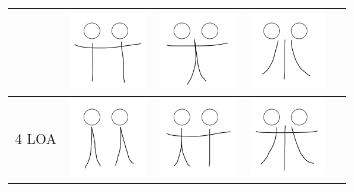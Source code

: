 \begin{table}[!htb]
\begin{tabular}{ | c | c || c | c | c | }
\begin{minipage}{.15\textwidth}
    \end{minipage}
    &
    \begin{minipage}{.15\textwidth}
      \includegraphics[width=\linewidth, height=20mm]{img/04keyframe}
    \end{minipage}
    &
    \begin{minipage}{.15\textwidth}
      \includegraphics[width=\linewidth, height=20mm]{img/05keyframe}
    \end{minipage} 
    & 
    \begin{minipage}{.15\textwidth}
      \includegraphics[width=\linewidth, height=20mm]{img/06keyframe}
    \end{minipage} 
    \\ \hline
    4 LOA 
    &
    \begin{minipage}{.15\textwidth}
      \includegraphics[width=\linewidth, height=20mm]{img/4loa_separate_keyframe}
    \end{minipage}
    &
    \begin{minipage}{.15\textwidth}
      \includegraphics[width=\linewidth, height=20mm]{img/07keyframe}
    \end{minipage}
    &
    \begin{minipage}{.15\textwidth}
      \includegraphics[width=\linewidth, height=20mm]{img/08keyframe}

\end{minipage}
\end{tabular}
\end{table}
